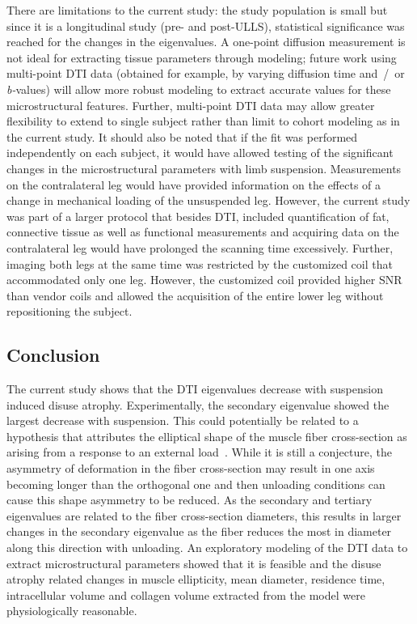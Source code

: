 There are limitations to the current study: the study population is small but since it is a longitudinal study (pre- and post-ULLS), statistical significance was reached for the changes in the eigenvalues. 
A one-point diffusion measurement is not ideal for extracting tissue parameters through modeling; future work using multi-point DTI data (obtained for example, by varying diffusion time and~/~or \mbox{\textit{b-}value}s) will allow more robust modeling to extract accurate values for these microstructural features. 
Further, multi-point DTI data may allow greater flexibility to extend to single subject rather than limit to cohort modeling as in the current study.
It should also be noted that if the fit was performed independently on each subject, it would have allowed testing of the significant changes in the microstructural parameters with limb suspension.
Measurements on the contralateral leg would have provided information on the effects of a change in mechanical loading of the unsuspended leg.
However, the current study was part of a larger protocol that besides DTI, included quantification of fat, connective tissue as well as functional measurements and acquiring data on the contralateral leg would have prolonged the scanning time excessively.
Further, imaging both legs at the same time was restricted by the customized coil that accommodated only one leg.
However, the customized coil provided higher SNR than vendor coils and allowed the acquisition of the entire lower leg without repositioning the subject.
\subsection{Conclusion}
The current study shows that the DTI eigenvalues decrease with suspension induced disuse atrophy. 
Experimentally, the secondary eigenvalue showed the largest decrease with suspension.
This could potentially be related to a hypothesis that attributes the elliptical shape of the muscle fiber cross-section as arising from a response to an external load~\cite{RND12}. 
While it is still a conjecture, the asymmetry of deformation in the fiber cross-section may result in one axis becoming longer than the orthogonal one and then unloading conditions can cause this shape asymmetry to be reduced. 
As the secondary and tertiary eigenvalues are related to the fiber cross-section diameters, this results in larger changes in the secondary eigenvalue as the fiber reduces the most in diameter along this direction with unloading. 
An exploratory modeling of the DTI data to extract microstructural parameters showed that it is feasible and the disuse atrophy related changes in muscle ellipticity, mean diameter, residence time, intracellular volume and collagen volume extracted from the model were physiologically reasonable.
